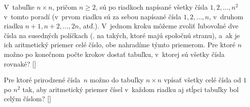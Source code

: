 {V~tabuľke $n\times n$, pričom $n\ge2$, sú po riadkoch napísané všetky čísla $1,2,\dots,n^2$ v~tomto poradí (v~prvom riadku sú za sebou napísané čísla $1,2,\dots,n$, v~druhom riadku ${n+1}, {n+2},\dots, 2n$, atď.). V~jednom kroku môžeme zvoliť ľubovoľné dve čísla na susedných políčkach (\tj. na takých, ktoré majú spoločnú stranu), a~ak je ich aritmetický priemer celé číslo, obe nahradíme týmto priemerom. Pre ktoré $n$ možno po konečnom počte krokov dostať tabuľku, v~ktorej sú všetky čísla rovnaké?
[]

Pre ktoré prirodzené čísla~$n$ možno do tabuľky $n \times n$ vpísať
všetky celé čísla od $1$ po $n^2$
tak, aby aritmetický priemer čísel v~každom riadku
aj stĺpci tabuľky bol celým číslom?
[]

}

